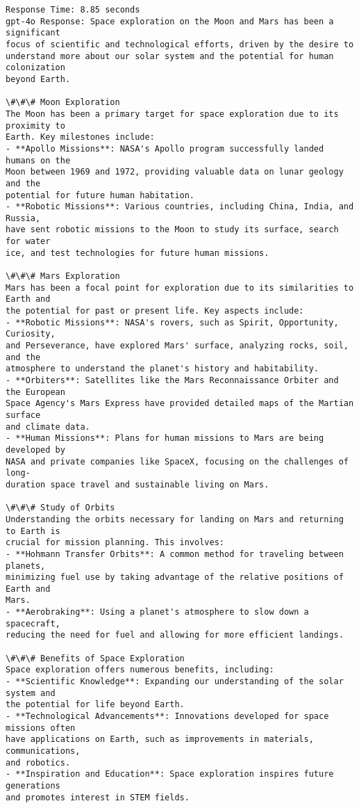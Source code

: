 \documentclass[11pt]{article}
\begin{document}
    \begin{Verbatim}[commandchars=\\\{\}]
Response Time: 8.85 seconds
gpt-4o Response: Space exploration on the Moon and Mars has been a significant
focus of scientific and technological efforts, driven by the desire to
understand more about our solar system and the potential for human colonization
beyond Earth.

\#\#\# Moon Exploration
The Moon has been a primary target for space exploration due to its proximity to
Earth. Key milestones include:
- **Apollo Missions**: NASA's Apollo program successfully landed humans on the
Moon between 1969 and 1972, providing valuable data on lunar geology and the
potential for future human habitation.
- **Robotic Missions**: Various countries, including China, India, and Russia,
have sent robotic missions to the Moon to study its surface, search for water
ice, and test technologies for future human missions.

\#\#\# Mars Exploration
Mars has been a focal point for exploration due to its similarities to Earth and
the potential for past or present life. Key aspects include:
- **Robotic Missions**: NASA's rovers, such as Spirit, Opportunity, Curiosity,
and Perseverance, have explored Mars' surface, analyzing rocks, soil, and the
atmosphere to understand the planet's history and habitability.
- **Orbiters**: Satellites like the Mars Reconnaissance Orbiter and the European
Space Agency's Mars Express have provided detailed maps of the Martian surface
and climate data.
- **Human Missions**: Plans for human missions to Mars are being developed by
NASA and private companies like SpaceX, focusing on the challenges of long-
duration space travel and sustainable living on Mars.

\#\#\# Study of Orbits
Understanding the orbits necessary for landing on Mars and returning to Earth is
crucial for mission planning. This involves:
- **Hohmann Transfer Orbits**: A common method for traveling between planets,
minimizing fuel use by taking advantage of the relative positions of Earth and
Mars.
- **Aerobraking**: Using a planet's atmosphere to slow down a spacecraft,
reducing the need for fuel and allowing for more efficient landings.

\#\#\# Benefits of Space Exploration
Space exploration offers numerous benefits, including:
- **Scientific Knowledge**: Expanding our understanding of the solar system and
the potential for life beyond Earth.
- **Technological Advancements**: Innovations developed for space missions often
have applications on Earth, such as improvements in materials, communications,
and robotics.
- **Inspiration and Education**: Space exploration inspires future generations
and promotes interest in STEM fields.


\end{Verbatim}
\end{document}
